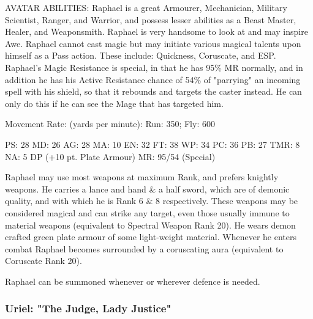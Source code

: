 \begin{Description}
AVATAR ABILITIES: Raphael is a great Armourer, Mechanician, Military
Scientist, Ranger, and Warrior, and possess lesser abilities as a
Beast Master, Healer, and Weaponsmith. Raphael is very handsome to
look at and may inspire Awe. Raphael cannot cast magic but may
initiate various magical talents upon himself as a Pass action. These
include: Quickness, Coruscate, and ESP. Raphael's Magic Resistance is
special, in that he has 95\% MR normally, and in addition he has his
Active Resistance chance of 54\% of "parrying" an incoming spell with
his shield, so that it rebounds and targets the caster instead. He can
only do this if he can see the Mage that has targeted him.


Movement Rate: (yards per minute): Run: 350; Fly: 600

PS: 28	MD: 26	AG: 28	MA: 10
EN: 32	FT: 38	WP: 34	PC: 36
PB: 27	TMR: 8	NA: 5 DP (+10 pt. Plate Armour)
MR: 95/54 (Special)

\item[Weapons] Raphael may use most weapons at maximum Rank, and
  prefers knightly weapons. He carries a lance and hand \& a half
  sword, which are of demonic quality, and with which he is Rank 6 \&
  8 respectively. These weapons may be considered magical and can
  strike any target, even those usually immune to material weapons
  (equivalent to Spectral Weapon Rank 20). He wears demon crafted
  green plate armour of some light-weight material. Whenever he enters
  combat Raphael becomes surrounded by a coruscating aura (equivalent
  to Coruscate Rank 20).

\item[Avatar Summoning] Raphael can be summoned whenever or wherever defence is needed. 

\end{Description}


\subsubsection{Uriel: "The Judge, Lady Justice"}

